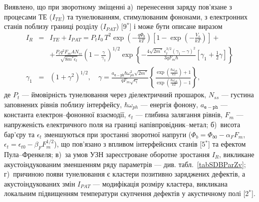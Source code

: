 Виявлено, що при зворотному зміщенні
а)~перенесення заряду пов'язане з процесами ТЕ ($I_{TE}$) та тунелюванням, стимулюваним фононами, з електронних станів поблизу границі розділу ($I_{P\!AT}$)
[9$^*$]
і може бути описане виразом
\begin{eqnarray}
\label{eqIgen}
 I_R&=&I_{TE}+I_{P\!AT}=P_tI_0\,T^2\exp\left(-\frac{q\Phi_b}{kT}\right)\left[1-\exp\left(-\frac{V_s}{kT}\right)\right]+\\
 &&+\frac{P_tq^2F_mAN_{ss}}{\sqrt{8m^*\epsilon_t}}\left(1-\frac{\gamma}{\gamma_1}\right)^{1/2}\exp
    \left\{-\frac{4\sqrt{2m^*}\,\epsilon_t^{3/2}\left(\gamma_1-\gamma\right)^2}{3qF_m\hbar} \nonumber
    [\gamma_1+\frac{1}{2}\gamma]\right\}\\ \nonumber
    \gamma_1&=&(1+\gamma^2)^{1/2}, \quad
    \gamma=\frac{a_\mathtt{e-ph}\hbar\omega_{ph}^2\sqrt{2m^*}}{qF_m\sqrt{\epsilon_t}}
    \left\{\frac{\exp\left(\frac{\hbar\omega_{ph}}{kT}\right)+1}{\exp\left(\frac{\hbar\omega_{ph}}{kT}\right)-1}\right\},   \nonumber
\end{eqnarray}
де
$P_t$ --- ймовірність тунелювання через діелектричний прошарок,
$N_{ss}$ --- густина заповнених рівнів поблизу інтерфейсу,
$\hbar\omega_{ph}$ --- енергія фонону,
$a_\mathtt{e-ph}$ --- константа електрон--фононної взаємодії,
$\epsilon_t$ --- глибина залягання рівнів,
$F_m$ --- напруженість електричного поля на границі напівпровідник--метал;
б)~висота бар'єру та $\epsilon_t$ зменшуються при зростанні зворотної напруги
($\Phi_{b}=\Phi_{b0}-\alpha_{F} F_m$,
$\epsilon_t=\epsilon_{t0}-\beta_F F_m^{1/2}$), що пов'язано з впливом інтерфейсних станів
[5$^*$] та ефектом Пула--Френкеля;
в)~за умов УЗН зареєстроване оборотне зростання $I_R$, викликане акустоіндукованим зменшенням ряду параметрів --- див. табл.~\ref{tabSDBParZv};
г)~причиною появи тунелювання є кластери позитивно заряджених дефектів, а акустоіндукованих змін $I_{P\!AT}$ --- модифікація розміру кластера, викликана
локальним підвищенням температури скупчення дефектів у акустичному полі
[2$^*$].



